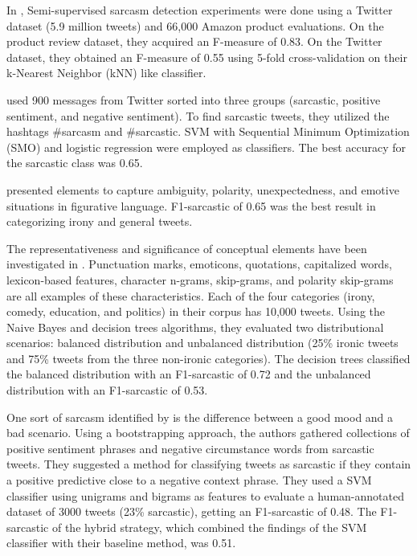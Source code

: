 \documentclass[11pt]{article}
\begin{document}
In \cite{davidov2010semi}, Semi-supervised sarcasm detection experiments were done using a Twitter dataset (5.9 million tweets) and 66,000 Amazon product evaluations. On the product review dataset, they acquired an F-measure of 0.83. On the Twitter dataset, they obtained an F-measure of 0.55 using 5-fold cross-validation on their k-Nearest Neighbor (kNN) like classifier.

\cite{gonzalez2011identifying} used 900 messages from Twitter sorted into three groups (sarcastic, positive sentiment, and negative sentiment). To find sarcastic tweets, they utilized the hashtags \#sarcasm and \#sarcastic. SVM with Sequential Minimum Optimization (SMO) and logistic regression were employed as classifiers. The best accuracy for the sarcastic class was 0.65.

\cite{reyes2012humor} presented elements to capture ambiguity, polarity, unexpectedness, and emotive situations in figurative language. F1-sarcastic of 0.65 was the best result in categorizing irony and general tweets.

The representativeness and significance of conceptual elements have been investigated in \cite{reyes2013multidimensional}. Punctuation marks, emoticons, quotations, capitalized words, lexicon-based features, character n-grams, skip-grams, and polarity skip-grams are all examples of these characteristics. Each of the four categories (irony, comedy, education, and politics) in their corpus has 10,000 tweets. Using the Naive Bayes and decision trees algorithms, they evaluated two distributional scenarios: balanced distribution and unbalanced distribution (25\% ironic tweets and 75\% tweets from the three non-ironic categories). The decision trees classified the balanced distribution with an F1-sarcastic of 0.72 and the unbalanced distribution with an F1-sarcastic of 0.53.

One sort of sarcasm identified by \cite{riloff2013sarcasm} is the difference between a good mood and a bad scenario. Using a bootstrapping approach, the authors gathered collections of positive sentiment phrases and negative circumstance words from sarcastic tweets. They suggested a method for classifying tweets as sarcastic if they contain a positive predictive close to a negative context phrase. They used a SVM classifier using unigrams and bigrams as features to evaluate a human-annotated dataset of 3000 tweets (23\% sarcastic), getting an F1-sarcastic of 0.48. The F1-sarcastic of the hybrid strategy, which combined the findings of the SVM classifier with their baseline method, was 0.51.
\end{document}
